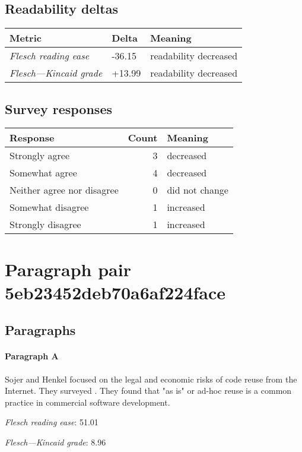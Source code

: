 \subsection{Readability deltas}

\begin{tabular}{lll}
\toprule
               \textbf{Metric} & \textbf{Delta} &       \textbf{Meaning} \\
\midrule
    \emph{Flesch reading ease} &         -36.15 &  readability decreased \\
 \emph{Flesch---Kincaid grade} &         +13.99 &  readability decreased \\
\bottomrule
\end{tabular}

\subsection{Survey responses}
\begin{tabular}{lrl}
\toprule
          \textbf{Response} &  \textbf{Count} & \textbf{Meaning} \\
\midrule
             Strongly agree &               3 &        decreased \\
             Somewhat agree &               4 &        decreased \\
 Neither agree nor disagree &               0 &   did not change \\
          Somewhat disagree &               1 &        increased \\
          Strongly disagree &               1 &        increased \\
\bottomrule
\end{tabular}

\section{Paragraph pair 5eb23452deb70a6af224face}
\subsection{Paragraphs}
\paragraph{Paragraph A}
Sojer and Henkel focused on the legal and economic risks of code reuse from the Internet. They surveyed . They found that "as is" or ad-hoc reuse is a common practice in commercial software development.\par\medskip
\emph{Flesch reading ease}: 51.01\par
\emph{Flesch---Kincaid grade}: 8.96

